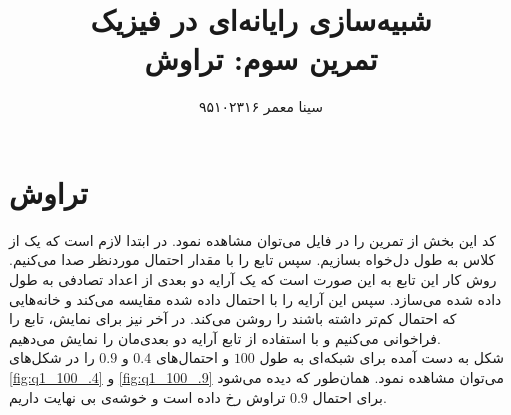 \documentclass[11pt, a4paper]{article}
\title{\textbf{شبیه‌سازی رایانه‌ای در فیزیک}\\تمرین سوم: تراوش}
\author{سینا معمر ۹۵۱۰۲۳۱۶}
\begin{document}
\maketitle
\thispagestyle{empty}


\section{\textbf{تراوش}}
کد این بخش از تمرین را در فایل
می‌توان مشاهده‌ نمود.
در ابتدا لازم است که یک
از کلاس
به طول دل‌خواه بسازیم.
سپس تابع
را با مقدار احتمال موردنظر صدا می‌کنیم.
روش کار این تابع به این صورت است که یک آرایه دو بعدی از اعداد تصادفی به طول داده شده می‌سازد.
سپس این آرایه را با احتمال داده شده مقایسه می‌کند و خانه‌هایی که احتمال کم‌تر داشته باشند را روشن می‌کند.
در آخر نیز برای نمایش، تابع
را فراخوانی می‌کنیم و با استفاده از تابع
آرایه دو بعدی‌مان را نمایش می‌دهیم.
\\
شکل به دست آمده برای شبکه‌ای به طول
$100$
و احتمال‌های 
$0.4$
و
$0.9$
را در شکل‌های
\ref{fig:q1_100_.4}
و
\ref{fig:q1_100_.9}
می‌توان مشاهده نمود.
همان‌طور که دیده می‌شود برای احتمال
$0.9$
تراوش رخ داده است و خوشه‌ی بی نهایت داریم.
\end{document}
